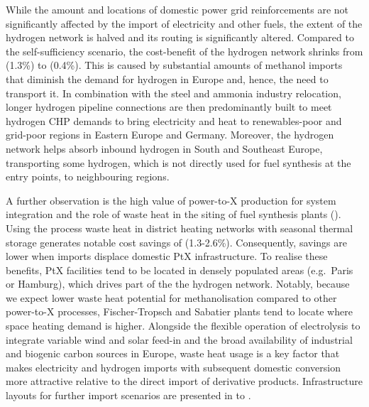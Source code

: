 While the amount and locations of domestic power grid reinforcements are not
significantly affected by the import of electricity and other fuels, the extent
of the hydrogen network is halved and its routing is significantly altered.
Compared to the self-sufficiency scenario, the cost-benefit of the hydrogen
network shrinks from  (1.3\%) to  (0.4\%). This is caused
by substantial amounts of methanol imports that diminish the demand for hydrogen
in Europe and, hence, the need to transport it. In combination with the steel
and ammonia industry relocation, longer hydrogen pipeline connections are then
predominantly built to meet hydrogen CHP demands to bring electricity and heat
to renewables-poor and grid-poor regions in Eastern Europe and Germany.
Moreover, the hydrogen network helps absorb inbound hydrogen in South and
Southeast Europe, transporting some hydrogen, which is not directly used for
fuel synthesis at the entry points, to neighbouring regions.


A further observation is the high value of power-to-X production for system
integration and the role of waste heat in the siting of fuel synthesis plants
(). Using the process waste heat in district heating
networks with seasonal thermal storage generates notable cost savings of
 (1.3-2.6\%). Consequently, savings are lower when imports
displace domestic PtX infrastructure. To realise these benefits, PtX facilities
tend to be located in densely populated areas (e.g.~Paris or Hamburg), which
drives part of the the hydrogen network. Notably, because we expect lower waste
heat potential for methanolisation compared to other power-to-X processes,
Fischer-Tropsch and Sabatier plants tend to locate where space heating demand is
higher. Alongside the flexible operation of electrolysis to integrate variable
wind and solar feed-in and the broad availability of industrial and biogenic
carbon sources in Europe, waste heat usage is a key factor that makes
electricity and hydrogen imports with subsequent domestic conversion more
attractive relative to the direct import of derivative products. Infrastructure
layouts for further import scenarios are presented in 
to .
